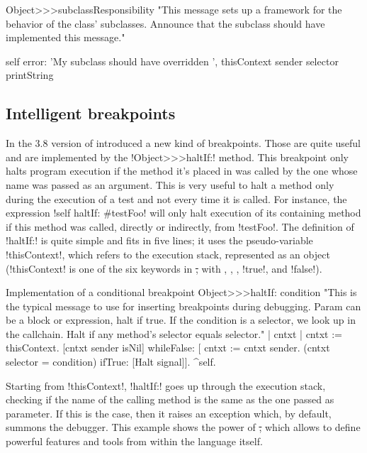 \documentclass[a4paper,10pt,twoside]{book}
\begin{document}
\begin{code}{}
Object>>>subclassResponsibility
	"This message sets up a framework for the behavior of the class' subclasses.
	Announce that the subclass should have implemented this message."

	self error: 'My subclass should have overridden ', thisContext sender selector printString
\end{code}

\subsection{Intelligent breakpoints}

 In the 3.8 version of \squeak introduced a new kind of breakpoints.
Those are quite useful and are implemented by the \ct!Object>>>haltIf:! method.
This breakpoint only halts program execution if the method it's placed in was called by the one whose name was passed as an argument.
This is very useful to halt a method only during the execution of a test and not every time it is called.
For instance, the expression \ct!self haltIf: #testFoo! will only halt execution of its containing method if this method was called, directly or indirectly, from \ct!testFoo!.
The definition of \ct!haltIf:! is quite simple and fits in five lines; it uses the pseudo-variable \ct!thisContext!, which refers to the execution stack, represented as an object (\ct!thisContext! is one of the six keywords in \st, with \self, \super, \nil, \ct!true!, and \ct!false!).

\begin{method}[objecthaltif]{Implementation of a conditional breakpoint}
Object>>>haltIf: condition
	"This is the typical message to use for inserting breakpoints during debugging. Param can be a block or expression, halt if true.
	If the condition is a selector, we look up in the callchain. Halt if any method's selector equals selector."
	| cntxt |
	cntxt := thisContext.
	[cntxt sender isNil] whileFalse: [
		cntxt := cntxt sender.
		(cntxt selector = condition) ifTrue: [Halt signal]].
	^self.
\end{method}

Starting from \ct!thisContext!, \ct!haltIf:! goes up through the execution stack, checking if the name of the calling method is the same as the one passed as parameter.
If this is the case, then it raises an exception which, by default, summons the debugger.
This example shows the power of \st, which allows to define powerful features and tools from within the language itself.
\end{document}
